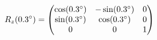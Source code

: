 \documentclass[preview]{standalone}
\begin{document}
\begin{align*}
\special{dvisvgm:raw <g id='unique000'>}R_z(0.3^\circ) = \begin{pmatrix} \cos(0.3^\circ) & -\sin(0.3^\circ) & 0 \\ \sin(0.3^\circ) & \cos(0.3^\circ) & 0 \\ 0 & 0 & 1 \end{pmatrix}\special{dvisvgm:raw </g>}
\end{align*}
\end{document}
